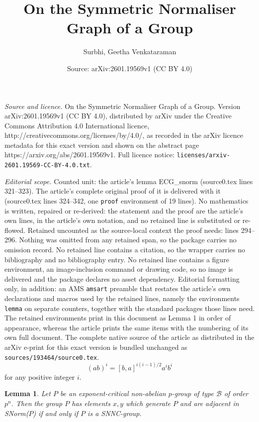 \documentclass[10pt,a4paper]{amsart}
\title{On the Symmetric Normaliser Graph of a Group}
\author{Surbhi, Geetha Venkataraman}
\date{Source: arXiv:2601.19569v1 (CC BY 4.0)}
\newtheorem{lemma}{Lemma}
\begin{document}
\maketitle

\noindent\emph{Source and licence.} On the Symmetric Normaliser Graph of a Group. Version arXiv:2601.19569v1 (CC BY 4.0), distributed by arXiv under the Creative Commons Attribution 4.0 International licence, http://creativecommons.org/licenses/by/4.0/, as recorded in the arXiv licence metadata for this exact version and shown on the abstract page https://arxiv.org/abs/2601.19569v1. Full licence notice: \texttt{licenses/arxiv-2601.19569-CC-BY-4.0.txt}.\par\smallskip

\noindent\textit{Editorial scope.} Counted unit: the article's lemma ECG\_snorm (source0.tex lines 321--323). The article's complete original proof of it is delivered with it (source0.tex lines 324--342, one \texttt{proof} environment of 19 lines). No mathematics is written, repaired or re-derived: the statement and the proof are the article's own lines, in the article's own notation, and no retained line is substituted or re-flowed.  Retained uncounted as the source-local context the proof needs: lines 294--296.  Nothing was omitted from any retained span, so the package carries no omission record.  No retained line contains a citation, so the wrapper carries no bibliography and no bibliography entry.  No retained line contains a figure environment, an image-inclusion command or drawing code, so no image is delivered and the package declares no asset dependency.  Editorial formatting only, in addition: an AMS \texttt{amsart} preamble that restates the article's own declarations and macros used by the retained lines, namely the environments \texttt{lemma} on separate counters, together with the standard packages those lines need.  The retained environments print in this document as Lemma 1 in order of appearance, whereas the article prints the same items with the numbering of its own full document.  The complete native source of the article as distributed in the arXiv e-print for this exact version is bundled unchanged as \texttt{sources/193464/source0.tex}.
\begin{equation}\label{id_ab}
    (ab)^i=[b,a]^{i(i-1)/2}a^ib^i
\end{equation} for any positive integer $i$.

\begin{lemma}\label{ECG_snorm}
    Let $P$ be an exponent-critical non-abelian $p$-group of type $\mathcal{B}$ of order $p^n$. Then the group $P$ has elements $x,y$ which generate $P$ and are adjacent in SNorm($P$) if and only if $P$ is a SNNC-group.
\end{lemma}
\end{document}

